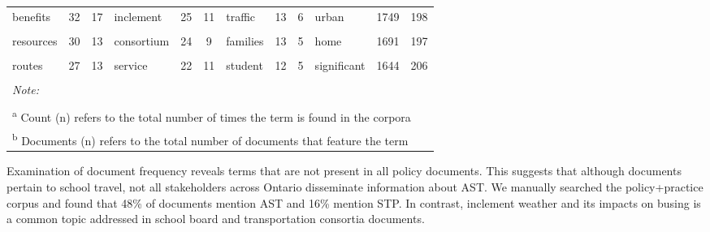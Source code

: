 \documentclass[preprint, 3p,
authoryear]{elsarticle} %
\begin{document}
\begin{table}
{\begin{tabular}[t]{lcclcclcclcc}
benefits & 32 & 17 & inclement & 25 & 11 & traffic & 13 & 6 & urban & 1749 & 198\\
\addlinespace
\cellcolor{gray!6}{play} & \cellcolor{gray!6}{31} & \cellcolor{gray!6}{2} & \cellcolor{gray!6}{eligibility} & \cellcolor{gray!6}{24} & \cellcolor{gray!6}{11} & \cellcolor{gray!6}{support} & \cellcolor{gray!6}{13} & \cellcolor{gray!6}{6} & \cellcolor{gray!6}{different} & \cellcolor{gray!6}{1695} & \cellcolor{gray!6}{213}\\
resources & 30 & 13 & consortium & 24 & 9 & families & 13 & 5 & home & 1691 & 197\\
\cellcolor{gray!6}{healthy} & \cellcolor{gray!6}{29} & \cellcolor{gray!6}{16} & \cellcolor{gray!6}{region} & \cellcolor{gray!6}{23} & \cellcolor{gray!6}{10} & \cellcolor{gray!6}{way} & \cellcolor{gray!6}{12} & \cellcolor{gray!6}{5} & \cellcolor{gray!6}{social} & \cellcolor{gray!6}{1672} & \cellcolor{gray!6}{189}\\
routes & 27 & 13 & service & 22 & 11 & student & 12 & 5 & significant & 1644 & 206\\
\cellcolor{gray!6}{lanes} & \cellcolor{gray!6}{26} & \cellcolor{gray!6}{3} & \cellcolor{gray!6}{•} & \cellcolor{gray!6}{21} & \cellcolor{gray!6}{1} & \cellcolor{gray!6}{region} & \cellcolor{gray!6}{12} & \cellcolor{gray!6}{4} & \cellcolor{gray!6}{mobility} & \cellcolor{gray!6}{1634} & \cellcolor{gray!6}{136}\\
\bottomrule
\multicolumn{12}{l}{\rule{0pt}{1em}\textit{Note: }}\\
\multicolumn{12}{l}{\rule{0pt}{1em} }\\
\multicolumn{12}{l}{\rule{0pt}{1em}\textsuperscript{a} Count (n) refers to the total number of times the term is found in the corpora}\\
\multicolumn{12}{l}{\rule{0pt}{1em}\textsuperscript{b} Documents (n) refers to the total number of documents that feature the term}\\
\end{tabular}}
\end{table}

Examination of document frequency reveals terms that are not present in
all policy documents. This suggests that although documents pertain to
school travel, not all stakeholders across Ontario disseminate
information about AST. We manually searched the policy+practice corpus
and found that 48\% of documents mention AST and 16\% mention STP. In
contrast, inclement weather and its impacts on busing is a common topic
addressed in school board and transportation consortia documents.
\end{document}
